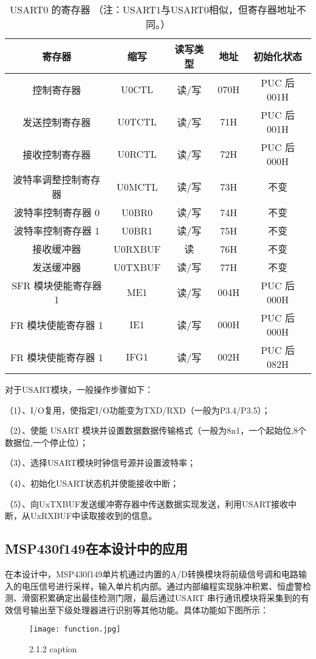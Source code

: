 \documentclass[12pt]{article} %
\begin{document}
		
		
\begin{table}[h]
			\begin{tabular}{|c|c|c|c|c|}
			\hline
		寄存器 & 缩写 & 读写类型 & 地址	& 初始化状态  \\
		\hline
		控制寄存器 & U0CTL & 读/写 & 070H & PUC 后 001H \\
		\hline
		发送控制寄存器 & U0TCTL & 读/写 & 71H & PUC 后 001H \\
		\hline
		接收控制寄存器 & U0RCTL & 读/写 & 72H & PUC 后 000H \\
		\hline
		波特率调整控制寄存器 & U0MCTL & 读/写 & 73H & 不变 \\
		\hline
		波特率控制寄存器 0 & U0BR0 & 读/写 & 74H & 不变 \\
		\hline
		波特率控制寄存器 1 & U0BR1 & 读/写 & 75H & 不变 \\
		\hline
		接收缓冲器  & U0RXBUF & 读 & 76H & 不变 \\
		\hline
		发送缓冲器  & U0TXBUF & 读/写 & 77H & 不变 \\
		\hline
		SFR 模块使能寄存器 1  & ME1 & 读/写 & 004H & PUC 后 000H \\
		\hline
		FR 模块使能寄存器 1  & IE1 & 读/写 & 000H & PUC 后 000H \\
		\hline
		FR 模块使能寄存器 1  & IFG1 & 读/写 & 002H & PUC 后 082H \\
		\hline

\end{tabular}
\caption{USART0 的寄存器 （注：USART1与USART0相似，但寄存器地址不同。）}
\label{}
\end{table}




	 	对于USART模块，一般操作步骤如下：
	 	\par（1）、I/O复用，使指定I/O功能变为TXD/RXD（一般为P3.4/P3.5）；
	 	\par （2）、使能 USART 模块并设置数据数据传输格式（一般为8n1，一个起始位,8个数据位,一个停止位）；
	 	\par （3）、选择USART模块时钟信号源并设置波特率；
	 	\par （4）、初始化USART状态机并使能接收中断；
	 	\par （5）、向UxTXBUF发送缓冲寄存器中传送数据实现发送，利用USART接收中断，从UxRXBUF中读取接收到的信息。
	 \subsection{\H MSP430f149在本设计中的应用}
	 在本设计中，MSP430f149单片机通过内置的A/D转换模块将前级信号调和电路输入的电压信号进行采样，输入单片机内部。通过内部编程实现脉冲积累、恒虚警检测、滑窗积累确定出最佳检测门限，最后通过USART 串行通讯模块将采集到的有效信号输出至下级处理器进行识别等其他功能。具体功能如下图所示：
	 \begin{figure}[H] %
 		  \centering
 		  \texttt{[image: function.jpg]} 
  		  \caption{2.1.2 caption}
  		 \label{fig:2.1.2}
		\end{figure}
	 	
\end{document}
